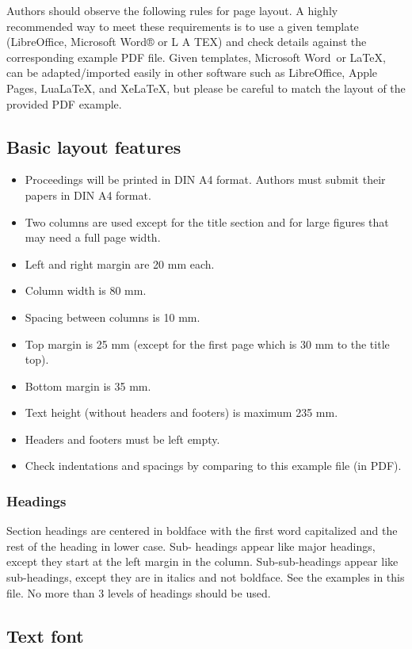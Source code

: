 \documentclass[a4paper]{article}
\begin{document}
Authors should observe the following rules for page layout. A highly recommended way to meet these requirements is to use a given template (LibreOffice, Microsoft Word® or L A TEX) and check details against the corresponding example PDF file. Given templates, Microsoft Word\textregistered\ or \LaTeX, can be adapted/imported easily in other software such as LibreOffice, Apple Pages, Lua\LaTeX, and Xe\LaTeX, but please be careful to match the layout of the provided PDF example.

\subsection{Basic layout features}

\begin{itemize}
\item Proceedings will be printed in DIN A4 format. Authors must submit their papers in DIN A4 format.
\item Two columns are used except for the title section and for large figures that may need a full page width.
\item Left and right margin are 20 mm each. 
\item Column width is 80 mm. 
\item Spacing between columns is 10 mm.
\item Top margin is 25 mm (except for the first page which is 30 mm to the title top).
\item Bottom margin is 35 mm.
\item Text height (without headers and footers) is maximum 235 mm.
\item Headers and footers must be left empty.
\item Check indentations and spacings by comparing to this example file (in PDF).
\end{itemize}

\subsubsection{Headings}

Section headings are centered in boldface with the first word capitalized and the rest of the heading in lower case. Sub- headings appear like major headings, except they start at the left margin in the column. Sub-sub-headings appear like sub-headings, except they are in italics and not boldface. See the examples in this file. No more than 3 levels of headings should be used.

\subsection{Text font}
\end{document}
